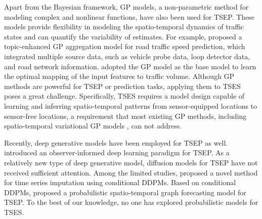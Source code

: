 \documentclass[a4paper,fleqn,12pt]{cas-sc}
\newcommand{\rev}[1]{{\color{red} #1}}
\begin{document}
Apart from the Bayesian framework, GP models, a non-parametric method for modeling complex and nonlinear functions, have also been used for TSEP. These models provide flexibility in modeling the spatio-temporal dynamics of traffic states and can quantify the variability of estimates. For example, \cite{wu2023traffic} proposed a topic-enhanced GP aggregation model for road traffic speed prediction, which integrated multiple source data, such as vehicle probe data, loop detector data, and road network information. \cite{liu2023gaussian} adopted the GP model as the base model to learn the optimal mapping of the input features to traffic volume. \rev{Although GP methods are powerful for TSEP or prediction tasks, applying them to TSES poses a great challenge. Specifically, TSES requires a model design capable of learning and inferring spatio-temporal patterns from sensor-equipped locations to sensor-free locations, a requirement that most existing GP methods, including spatio-temporal variational GP models \citep{todescato2020efficient,hamelijnck2021spatio}, can not address.}

Recently, deep generative models have been employed for TSEP as well. \cite{zhao2022integrating} introduced an observer-informed deep learning paradigm for TSEP. As a relatively new type of deep generative model, diffusion models for TSEP have not received sufficient attention. Among the limited studies, \cite{tashiro2021csdi} proposed a novel method for time series imputation using conditional DDPMs. Based on conditional DDPMs, \cite{wen2023diffstg} proposed a probabilistic spatio-temporal graph forecasting model for TSEP. To the best of our knowledge, no one has explored probabilistic models for TSES.
\end{document}
